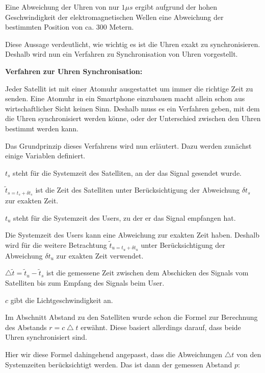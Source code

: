 Eine Abweichung der Uhren von nur $1\mu s$ ergibt aufgrund der hohen Geschwindigkeit der elektromagnetischen Wellen eine Abweichung der bestimmten Position von ca. 300 Metern.
\cite[S. 189]{Schiller2004}

Diese Aussage verdeutlicht, wie wichtig es ist die Uhren exakt zu synchronisieren. Deshalb wird nun ein Verfahren zu Synchronisation von Uhren vorgestellt.


\textbf{Verfahren zur Uhren Synchronisation:}

Jeder Satellit ist mit einer Atomuhr ausgestattet um immer die richtige Zeit zu senden. Eine Atomuhr in ein Smartphone einzubauen macht allein schon aus wirtschaftlicher Sicht keinen Sinn. Deshalb muss es ein Verfahren geben, mit dem die Uhren synchronisiert werden könne, oder der Unterschied zwischen den Uhren bestimmt werden kann.
\cite[S.189]{Schiller2004}

Das Grundprinzip dieses Verfahrens wird nun erläutert. Dazu werden zunächst einige Variablen definiert.

$ t_{s} $ steht für die Systemzeit des Satelliten, an der das Signal gesendet wurde.

$ \tilde{t}_{s = t_{s} + \delta t_{s}} $ ist die Zeit des Satelliten unter Berücksichtigung der Abweichung $ \delta t_{s} $ zur exakten Zeit.

$ t_{u} $ steht für die Systemzeit des Users, zu der er das Signal empfangen hat.

Die Systemzeit des Users kann eine Abweichung zur exakten Zeit haben. Deshalb wird für die weitere Betrachtung $ \tilde{t}_{u = t_{u} + \delta t_{u}} $ unter Berücksichtigung der Abweichung $ \delta t_{u} $ zur exakten Zeit verwendet.

$ \bigtriangleup \tilde{t} = \tilde{t}_{u} - \tilde{t}_{s} $ ist die gemessene Zeit zwischen dem Abschicken des Signals vom Satelliten bis zum Empfang des Signals beim User.

$ c $ gibt die Lichtgeschwindigkeit an.

Im Abschnitt \glqq Abstand zu den Satelliten \grqq wurde schon die Formel zur Berechnung des Abstands $ r = c \bigtriangleup t $ erwähnt. Diese basiert allerdings darauf, dass beide Uhren synchronisiert sind.

Hier wir diese Formel dahingehend angepasst, dass die Abweichungen $\bigtriangleup t$ von den Systemzeiten berücksichtigt werden. Das ist dann der gemessen Abstand $p$:

\cite[S. 189 - 190]{Schiller2004}

